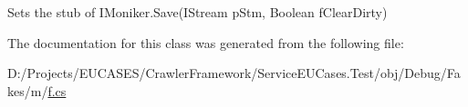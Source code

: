 Sets the stub of I\-Moniker.\-Save(\-I\-Stream p\-Stm, Boolean f\-Clear\-Dirty)



The documentation for this class was generated from the following file\-:\begin{DoxyCompactItemize}
\item 
D\-:/\-Projects/\-E\-U\-C\-A\-S\-E\-S/\-Crawler\-Framework/\-Service\-E\-U\-Cases.\-Test/obj/\-Debug/\-Fakes/m/\hyperlink{m_2f_8cs}{f.\-cs}\end{DoxyCompactItemize}
